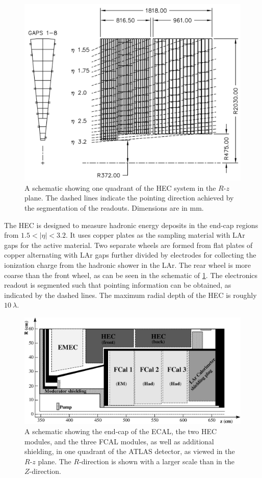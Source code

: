 \begin{figure}[tb] 
\centering
\includegraphics[width=.7\textwidth]{figures/atlas/hec.pdf}
\caption{ A schematic showing one quadrant of the 
HEC system in the $R$-$z$ plane. The dashed lines indicate
the pointing direction achieved by the segmentation of the 
readouts.  Dimensions are in mm.  }
\label{fig:atlas_hec}
\end{figure}


The HEC is designed to measure hadronic energy deposits in the 
end-cap regions from $1.5 < |\eta|< 3.2$. It uses 
copper plates as the sampling material with LAr gaps
for the active material. Two separate wheels are formed from
flat plates of copper alternating with LAr gaps further divided by electrodes for
collecting the ionization charge from the hadronic shower in the LAr.
The rear wheel is more coarse than the front wheel,
as can be seen in the schematic of \fig\ref{fig:atlas_hec}.
The electronics readout is segmented such that pointing information
can be obtained, as indicated by the dashed lines.
The maximum radial depth of the HEC is roughly $10~\lambda$.



\begin{figure}[ht] 
\centering
\includegraphics[width=.95\textwidth]{figures/atlas/fcal.eps}
\caption{ A schematic showing the end-cap of the ECAL,
the two HEC modules, and the three FCAL modules, as well
as additional shielding, in one
quadrant of the ATLAS detector, as viewed 
in the $R$-$z$ plane.
The $R$-direction is shown with a larger scale than in the $Z$-direction.
}
\label{fig:atlas_fcal}
\end{figure}


